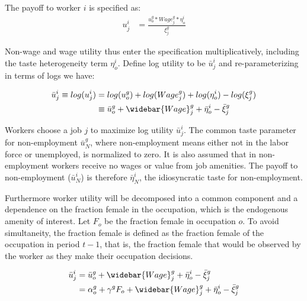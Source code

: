 \documentclass[12pt]{article}
\begin{document}
The payoff to worker $i$ is specified as:
\begin{align} \label{worker}
u^i_j &= \frac{ u^g_o*Wage^g_j *  \eta^i_o } {\xi^g_j}    
\end{align}

Non-wage and wage utility thus enter the specification multiplicatively, including the taste heterogeneity term $\eta^i_o$. Define log utility to be $\bar{u}^{i}_j$ and re-parameterizing in terms of logs we have:

\begin{align} \label{logworker}
\bar{u}^{i}_j \equiv log(u^i_j) &= log(u^g_o) + log(Wage^g_j)  + log(\eta^i_o) - log(\xi^g_j)   \\ \nonumber
&\equiv  \bar{u}^{g}_o + \widebar{Wage}^g_j   + \bar{\eta}^i_o - \bar{\xi}^g_j 
\end{align}

Workers choose a job $j$ to maximize log utility $\bar{u}^{i}_j$. The common taste parameter for non-employment $\bar{u}^g_N$, where non-employment means either not in the labor force or unemployed, is normalized to zero. It is also assumed that in non-employment workers receive no wages or value from job amenities. The payoff to non-employment ($\bar{u}^i_N$) is therefore  $ \bar{\eta}^i_N $, the idiosyncratic taste for non-employment.


Furthermore worker utility will be decomposed into a common component and a dependence on the fraction female in the occupation, which is the endogenous amenity of interest. Let $F_o$ be the fraction female in occupation $o$. To avoid simultaneity, the fraction female is defined as the fraction female of the occupation in period $t-1$, that is, the fraction female that would be observed by the worker as they make their occupation decisions.

\begin{align*}
\bar{u}^{i}_j &= \bar{u}^{g}_o + \widebar{Wage}^g_j   + \bar{\eta}^i_o - \bar{\xi}^g_j \\
    &= \alpha^g_o +   \gamma^g F_o + \widebar{Wage}^g_j   + \bar{\eta}^i_o - \bar{\xi}^g_j
\end{align*}
\end{document}
